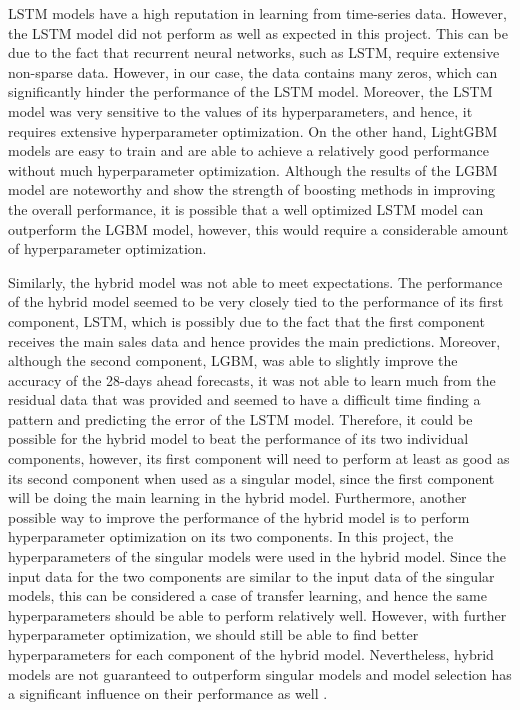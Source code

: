 LSTM models have a high reputation in learning from time-series data. 
However, the LSTM model did not perform as well as expected in this project.
This can be due to the fact that recurrent neural networks, such as LSTM, require extensive non-sparse data.
However, in our case, the data contains many zeros, which can significantly hinder the performance of the LSTM model.
Moreover, the LSTM model was very sensitive to the values of its hyperparameters, and hence, it requires extensive hyperparameter optimization.
On the other hand, LightGBM models are easy to train and are able to achieve a relatively good performance without much hyperparameter optimization.
Although the results of the LGBM model are noteworthy and show the strength of boosting methods in improving the overall performance, it is possible that a well optimized LSTM model can outperform the LGBM model, however, this would require a considerable amount of hyperparameter optimization.

Similarly, the hybrid model was not able to meet expectations. 
The performance of the hybrid model seemed to be very closely tied to the performance of its first component, LSTM, which is possibly due to the fact that the first component receives the main sales data and hence provides the main predictions.
Moreover, although the second component, LGBM, was able to slightly improve the accuracy of the 28-days ahead forecasts, it was not able to learn much from the residual data that was provided and seemed to have a difficult time finding a pattern and predicting the error of the LSTM model.
Therefore, it could be possible for the hybrid model to beat the performance of its two individual components, however, its first component will need to perform at least as good as its second component when used as a singular model, since the first component will be doing the main learning in the hybrid model.
Furthermore, another possible way to improve the performance of the hybrid model is to perform hyperparameter optimization on its two components.
In this project, the hyperparameters of the singular models were used in the hybrid model.
Since the input data for the two components are similar to the input data of the singular models, this can be considered a case of transfer learning, and hence the same hyperparameters should be able to perform relatively well.
However, with further hyperparameter optimization, we should still be able to find better hyperparameters for each component of the hybrid model.
Nevertheless, hybrid models are not guaranteed to outperform singular models and model selection has a significant influence on their performance as well \cite{c12}.

